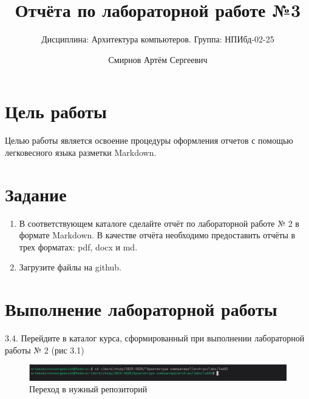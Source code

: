 \documentclass[
  english,
  russian,
  12pt,
  a4paper,
  DIV=11,
  numbers=noendperiod]{scrreprt}
\title{Отчёта по лабораторной работе №3}
\subtitle{Дисциплина: Архитектура компьютеров. Группа: НПИбд-02-25}
\author{Смирнов Артём Сергеевич}
\date{}
\providecommand{\tightlist}{%
  \setlength{\itemsep}{0pt}\setlength{\parskip}{0pt}}
\renewcommand*\contentsname{Содержание}
\newcommand\contentsname{Содержание}
\begin{document}
\maketitle

\renewcommand*\contentsname{Содержание}
{
\setcounter{tocdepth}{1}
\tableofcontents
}
\listoffigures
\listoftables

\chapter{Цель
работы}\label{ux446ux435ux43bux44c-ux440ux430ux431ux43eux442ux44b}

Целью работы является освоение процедуры оформления отчетов с помощью
легковесного языка разметки Markdown.

\chapter{Задание}\label{ux437ux430ux434ux430ux43dux438ux435}

\begin{enumerate}
\def\labelenumi{\arabic{enumi}.}
\tightlist
\item
  В соответствующем каталоге сделайте отчёт по лабораторной работе № 2 в
  формате Markdown. В качестве отчёта необходимо предоставить отчёты в
  трех форматах: pdf, docx и md.
\item
  Загрузите файлы на github.
\end{enumerate}

\chapter{Выполнение лабораторной
работы}\label{ux432ux44bux43fux43eux43bux43dux435ux43dux438ux435-ux43bux430ux431ux43eux440ux430ux442ux43eux440ux43dux43eux439-ux440ux430ux431ux43eux442ux44b}

3.4. Перейдите в каталог курса, сформированный при выполнении
лабораторной работы № 2 (рис 3.1)

\begin{figure}

{\centering \includegraphics[width=0.9\linewidth,height=\textheight,keepaspectratio]{image/1.png}

}

\caption{Переход в нужный репозиторий}

\end{figure}%
\end{document}
